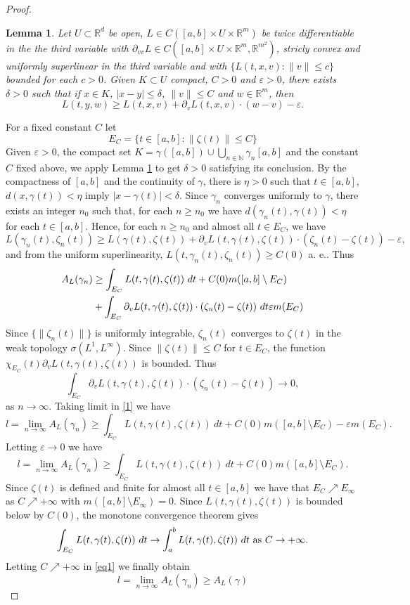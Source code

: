 \documentclass[10pt,a4paper]{amsart}
\newtheorem{lemma}{Lemma}
\newcommand{\N}{\mathbb N}
\newcommand{\R}{\mathbb R}
\newcommand{\ep}{\varepsilon}
\newcommand{\ga}{\gamma}
\newcommand{\de}{\delta}
\newcommand{\entre}{\setminus}
\begin{document}
\begin{proof}
   \begin{lemma}\label{LemCle}
     Let $U\subset\R^d$ be open, $L\in C([a,b]\times U\times\R^m)$ be
     twice differentiable in the the third variable with
     $\partial_{vv}L\in C([a,b]\times U\times\R^m,\R^{m^2})$, stricly convex
       and uniformly superlinear in the third variable and with
$\{L(t,x,v):\|v\|\le c\}$ bounded for each $c>0$.
     Given $K\subset U$ compact, $C>0$ and $\ep>0$, there exists $\de>0$
  such that if $x\in K$, $| x-y|\le\de$, $\|v\|\le C$ and $w\in\R^m$,
  then
  \[  L(t,y,w)\ge L(t,x,v)+\partial_v L(t,x,v)\cdot(w-v) -\ep.\]
  \end{lemma}
  For a fixed constant $C$ let
   \[E_C=\{t\in[a,b]:\|\zeta(t)\|\le C\}  \]
  Given $\ep> 0$, the compact set $K=\ga([a, b])\cup\bigcup_{n\in\N} \ga_n[a, b]$ 
and the  constant $C$ fixed above, we apply Lemma \ref{LemCle} to get $\de >0$
  satisfying its conclusion. By the compactness of $[a,b]$ and the
  continuity of $\ga$, 
  there is $\eta>0$ such that  $t\in[a,b]$, $d(x,\ga(t)) < \eta$
  imply $|x-\ga(t)| < \de.$
 Since  $\ga_n$ converges uniformly to $\ga$,
  there exists an integer $n_0$ such that, for each $n\ge n_0$
  we have $d(\ga_n(t),\ga(t)) < \eta$ for each $t\in[a, b]$.
Hence, for each $n\ge n_0$ and almost all $t \in E_C$, we have
  \[L (\ga_n(t),\zeta_n(t))\ge L (\ga(t), \zeta(t)) +
    \partial_v L(t,\ga(t), \zeta(t))\cdot(\zeta_n(t) -\zeta(t))-\ep,\]
 and from the uniform superlinearity, $L(t,\ga_n(t), \zeta_n(t))\ge C(0)$
 a. e.. Thus
  \begin{align}\nonumber
    A_L(\ga_n)&\ge \int_{E_C}L(t,\ga(t), \zeta(t))\ dt
                       +C(0)m([a,b]\entre E_C)\\
& +\int_{E_C}\partial_vL(t,\ga(t), \zeta(t))\cdot (\zeta_n(t) -\zeta(t))\ dt
\-\ep m(E_C) \label{1}
  \end{align}
  Since $\{\|\zeta_n(t)\|\}$ is uniformly integrable, $\zeta_n(t)$ converges to
  $\zeta(t)$ in the weak topology $\sigma(L^1,L^\infty)$.
Since $\|\zeta(t)\|\le C$ for $t\in E_C$, the function $\chi_{E_C}(t)\partial_vL(t,\ga(t), \zeta(t))$
is bounded. Thus
\[\int_{E_C}\partial_v L(t,\ga(t), \zeta(t))\cdot (\zeta_n(t) -\zeta(t))\to 0,\]
as $n\to\infty$. Taking limit in \eqref{1} we have
\[l=\lim_{n\to\infty}A_L(\ga_n)\ge \int_{E_C}L(t,\ga(t), \zeta(t))\ dt
  +C(0) m([a,b]\entre E_C)-\ep m(E_C).\]
Letting $\ep\to 0$ we have
\begin{equation}
  \label{eq1}
  l=\lim_{n\to\infty}A_L(\ga_n)\ge \int_{E_C}L(t,\ga(t), \zeta(t))\ dt
  +C(0) m([a,b]\entre E_C).
\end{equation}
Since $\zeta(t)$ is defined and finite for almost all $t\in[a,b]$ we
have that $E_C\nearrow E_\infty$ as $C\nearrow +\infty$ with
$m([a,b]\entre E_\infty)=0$. Since $L(t,\ga(t), \zeta(t))$ is bounded below by $C(0)$,
the monotone convergence theorem gives
\[\int_{E_C}L(t,\ga(t), \zeta(t))\ dt\to\int_a^bL(t,\ga(t), \zeta(t))\ dt \hbox{ as }C\to+\infty.\]
Letting $C\nearrow+\infty$ in \eqref{eq1} we finally obtain
\[l=\lim_{n\to\infty}A_L(\ga_n) \ge A_L(\ga)\]
\end{proof}
\end{document}
